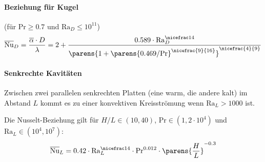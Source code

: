 	\paragraph{Beziehung für Kugel} %
		(für $\mathrm{Pr} \geq 0.7$ und $\mathrm{Ra}_D \leq 10^{11}$)
		\[
			\overline{\mathrm{Nu}}_D = \frac{\overline{\alpha} \cdot D}{\lambda} = 2 + \frac{0.589 \cdot \mathrm{Ra}_D^{\nicefrac 1 4}}{\parens{1 + \parens{0.469 / \mathrm{Pr}}^{\nicefrac{9}{16}}}^{\nicefrac{4}{9}}}
		\]

	\paragraph{Senkrechte Kavitäten} %
		Zwischen zwei parallelen senkrechten Platten (eine warm, die andere kalt) im Abstand $L$ kommt es zu einer konvektiven Kreisströmung wenn $\mathrm{Ra}_L > 1000$ ist.

		Die Nusselt-Beziehung gilt für $H/L \in (10,40)$, $\mathrm{Pr} \in (1,2\cdot10^4)$ und $\mathrm{Ra}_L \in (10^4,10^7)$:
		\[
		\overline{\mathrm{Nu}}_L = 0.42 \cdot \mathrm{Ra}_L^{\nicefrac 1 4} \cdot \mathrm{Pr}^{0.012} \cdot \parens{\frac H L}^{-0.3}
		\]
